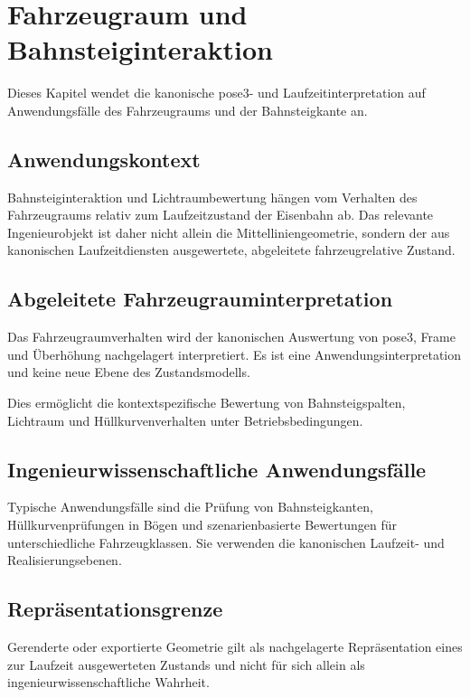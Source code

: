 
\chapter{Fahrzeugraum und Bahnsteiginteraktion}
\label{chap:applications-vehicle-space-platform}

Dieses Kapitel wendet die kanonische pose3- und Laufzeitinterpretation auf
Anwendungsfälle des Fahrzeugraums und der Bahnsteigkante an.

\section{Anwendungskontext}

Bahnsteiginteraktion und Lichtraumbewertung hängen vom Verhalten des
Fahrzeugraums relativ zum Laufzeitzustand der Eisenbahn ab. Das relevante
Ingenieurobjekt ist daher nicht allein die Mittelliniengeometrie, sondern
der aus kanonischen Laufzeitdiensten ausgewertete, abgeleitete
fahrzeugrelative Zustand.

\section{Abgeleitete Fahrzeugrauminterpretation}

Das Fahrzeugraumverhalten wird der kanonischen Auswertung von pose3,
Frame und Überhöhung nachgelagert interpretiert. Es ist eine
Anwendungsinterpretation und keine neue Ebene des Zustandsmodells.

Dies ermöglicht die kontextspezifische Bewertung von Bahnsteigspalten,
Lichtraum und Hüllkurvenverhalten unter Betriebsbedingungen.

\section{Ingenieurwissenschaftliche Anwendungsfälle}

Typische Anwendungsfälle sind die Prüfung von Bahnsteigkanten,
Hüllkurvenprüfungen in Bögen und szenarienbasierte Bewertungen für
unterschiedliche Fahrzeugklassen. Sie verwenden die kanonischen Laufzeit-
und Realisierungsebenen.

\section{Repräsentationsgrenze}

Gerenderte oder exportierte Geometrie gilt als nachgelagerte
Repräsentation eines zur Laufzeit ausgewerteten Zustands und nicht für
sich allein als ingenieurwissenschaftliche Wahrheit.

